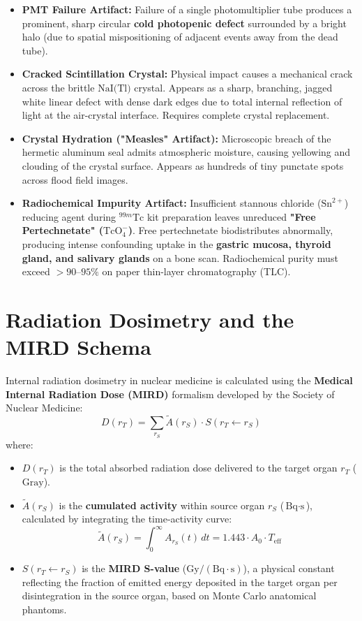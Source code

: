 \documentclass[11pt,a4paper]{article}
\begin{document}
\begin{itemize}[leftmargin=*]
    \item \textbf{PMT Failure Artifact:} Failure of a single photomultiplier tube produces a prominent, sharp circular \textbf{cold photopenic defect} surrounded by a bright halo (due to spatial mispositioning of adjacent events away from the dead tube).
    \item \textbf{Cracked Scintillation Crystal:} Physical impact causes a mechanical crack across the brittle $\text{NaI(Tl)}$ crystal. Appears as a sharp, branching, jagged white linear defect with dense dark edges due to total internal reflection of light at the air-crystal interface. Requires complete crystal replacement.
    \item \textbf{Crystal Hydration ("Measles" Artifact):} Microscopic breach of the hermetic aluminum seal admits atmospheric moisture, causing yellowing and clouding of the crystal surface. Appears as hundreds of tiny punctate spots across flood field images.
    \item \textbf{Radiochemical Impurity Artifact:} Insufficient stannous chloride ($\text{Sn}^{2+}$) reducing agent during $^{99m}\text{Tc}$ kit preparation leaves unreduced \textbf{"Free Pertechnetate" ($\text{TcO}_4^-$)}. Free pertechnetate biodistributes abnormally, producing intense confounding uptake in the \textbf{gastric mucosa, thyroid gland, and salivary glands} on a bone scan. Radiochemical purity must exceed \textbf{$> 90\text{--}95\%$} on paper thin-layer chromatography (TLC).
\end{itemize}

\newpage
\section{Radiation Dosimetry and the MIRD Schema}

Internal radiation dosimetry in nuclear medicine is calculated using the \textbf{Medical Internal Radiation Dose (MIRD)} formalism developed by the Society of Nuclear Medicine:
\begin{equation}
    D(r_T) = \sum_{r_S} \tilde{A}(r_S) \cdot S(r_T \leftarrow r_S)
\end{equation}
where:
\begin{itemize}[leftmargin=*]
    \item $D(r_T)$ is the total absorbed radiation dose delivered to the target organ $r_T$ ($\text{Gray}$).
    \item $\tilde{A}(r_S)$ is the \textbf{cumulated activity} within source organ $r_S$ ($\text{Bq}\cdot\text{s}$), calculated by integrating the time-activity curve:
    \begin{equation}
        \tilde{A}(r_S) = \int_0^\infty A_{r_S}(t) \, dt = 1.443 \cdot A_0 \cdot T_{\text{eff}}
    \end{equation}
    \item $S(r_T \leftarrow r_S)$ is the \textbf{MIRD S-value} ($\text{Gy} / (\text{Bq}\cdot\text{s})$), a physical constant reflecting the fraction of emitted energy deposited in the target organ per disintegration in the source organ, based on Monte Carlo anatomical phantoms.
\end{itemize}
\end{document}
